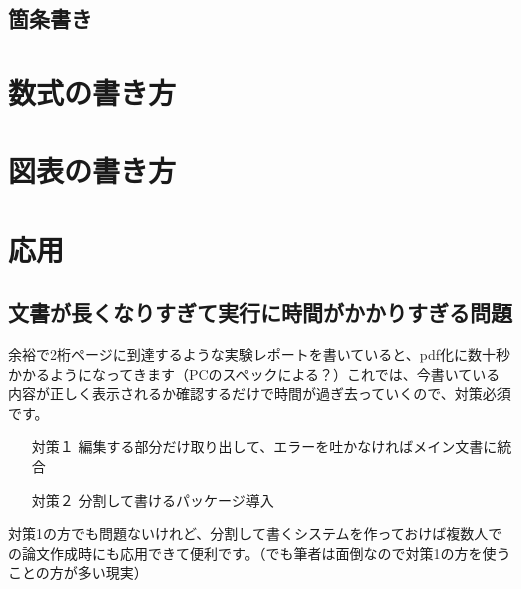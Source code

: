 \documentclass[uplatex,dvipdfmx]{jsarticle}
\numberwithin{equation}{section}
\begin{document}
\subsection{箇条書き}
\section{数式の書き方}
\section{図表の書き方}
\section{応用}
\subsection{文書が長くなりすぎて実行に時間がかかりすぎる問題}
余裕で2桁ページに到達するような実験レポートを書いていると、pdf化に数十秒かかるようになってきます（PCのスペックによる？）これでは、今書いている内容が正しく表示されるか確認するだけで時間が過ぎ去っていくので、対策必須です。
\begin{itemize}
  \item[対策１] 編集する部分だけ取り出して、エラーを吐かなければメイン文書に統合
  \item[対策２] 分割して書けるパッケージ導入
\end{itemize}
対策1の方でも問題ないけれど、分割して書くシステムを作っておけば複数人での論文作成時にも応用できて便利です。（でも筆者は面倒なので対策1の方を使うことの方が多い現実）
\end{document}
